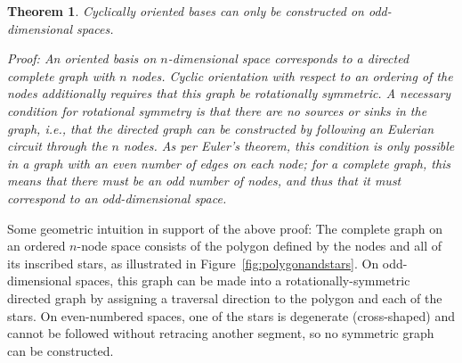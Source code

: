 \documentclass[11pt]{article}
\newtheorem{theorem}{Theorem}[section]
\begin{document}
\begin{theorem}{Cyclically oriented bases can only be constructed on odd-dimensional spaces.}

Proof: An oriented basis on $n$-dimensional space corresponds to a directed complete graph with $n$ nodes. Cyclic orientation with respect to an ordering of the nodes additionally requires that this graph be rotationally symmetric. A necessary condition for rotational symmetry is that there are no sources or sinks in the graph, i.e., that the directed graph can be constructed by following an Eulerian circuit through the $n$ nodes. As per Euler’s theorem, this condition is only possible in a graph with an even number of edges on each node; for a complete graph, this means that there must be an odd number of nodes, and thus that it must correspond to an odd-dimensional space.

\end{theorem}


Some geometric intuition in support of the above proof: The complete graph on an ordered $n$-node space consists of the polygon defined by the nodes and all of its inscribed stars, as illustrated in Figure~\ref{fig:polygonandstars}. On odd-dimensional spaces, this graph can be made into a rotationally-symmetric directed graph by assigning a traversal direction to the polygon and each of the stars. On even-numbered spaces, one of the stars is degenerate (cross-shaped) and cannot be followed without retracing another segment, so no symmetric graph can be constructed.
\end{document}
